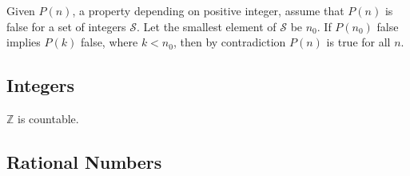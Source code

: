   \begin{theorem}
    Given $P(n)$, a property depending on positive integer, assume that $P(n)$ is false for a set of integers $\mathcal{S}$. Let the smallest element of $\mathcal{S}$ be $n_0$. If $P(n_0)$ false implies $P(k)$ false, where $k < n_0$, then by contradiction $P(n)$ is true for all $n$. 
  \end{theorem}

\subsection{Integers} 

  \begin{theorem}[Countability]
    $\mathbb{Z}$ is countable. 
  \end{theorem}

\subsection{Rational Numbers} 

